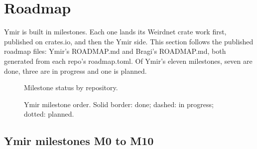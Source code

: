 \section{Roadmap}\label{sec:roadmap}

Ymir is built in milestones. Each one lands its Weirdnet crate work first, published on crates.io,
and then the Ymir side. This section follows the published roadmap files: Ymir's ROADMAP.md
and Bragi's ROADMAP.md, both generated from each repo's
roadmap.toml. Of Ymir's eleven milestones, seven are done, three are in progress and one is
planned.

\begin{figure}[htbp]
\centering
{}
\caption{Milestone status by repository.}
\end{figure}

\begin{figure}[htbp]
\centering
{}
\caption{Ymir milestone order. Solid border: done; dashed: in progress; dotted: planned.}
\end{figure}

\subsection{Ymir milestones M0 to M10}\label{sec:roadmap-ymir}

